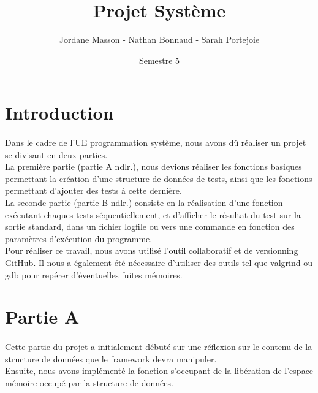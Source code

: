 \documentclass[12pt]{article}
\title{Projet Système}
\author{Jordane Masson - Nathan Bonnaud - Sarah Portejoie}
\date{Semestre 5}
\begin{document}
\maketitle

\newpage
\section{Introduction}

\paragraph{}
Dans le cadre de l'UE programmation système, nous avons dû réaliser un projet se divisant en deux parties. \\

La première partie (partie A ndlr.), nous devions réaliser les fonctions basiques permettant la création d'une structure de données de tests, ainsi que les fonctions permettant d'ajouter des tests à cette dernière.\\

La seconde partie (partie B ndlr.) consiste en la réalisation d'une fonction exécutant chaques tests séquentiellement, et d'afficher le résultat du test sur la sortie standard, dans un fichier logfile ou vers une commande en fonction des paramètres d'exécution du programme.\\

Pour réaliser ce travail, nous avons utilisé l'outil collaboratif et de versionning GitHub. Il nous a également été nécessaire d'utiliser des outils tel que valgrind ou gdb pour repérer d'éventuelles fuites mémoires.\\


\newpage
\section{Partie A}

\paragraph{}
Cette partie du projet a initialement débuté sur une réflexion sur le contenu de la structure de données que le framework devra manipuler. \\

Ensuite, nous avons implémenté la fonction s'occupant de la libération de l'espace mémoire occupé par la structure de données. \\
\end{document}
